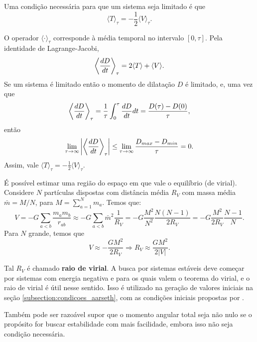 \begin{theorem}\label{teorema:virial}
    Uma condição necessária para que um sistema seja limitado é que
    \begin{equation*}
        \langle T \rangle_\tau = - \frac{1}{2} \langle V \rangle_\tau.
    \end{equation*}
\end{theorem}
\begin{Proof}
    O operador $\langle \cdot \rangle_\tau$ corresponde à média temporal no intervalo $[0, \tau]$. Pela identidade de Lagrange-Jacobi,
    \begin{equation*}
        \left\langle \dfrac{d D}{d t} \right\rangle_{\tau}
        = 2 \langle T \rangle + \langle V \rangle.
    \end{equation*}
    Se um sistema é limitado então o momento de dilatação $D$ é limitado, e, uma vez que
    \begin{equation*}
        \left\langle \dfrac{d D}{d t} \right\rangle_{\tau}
        = \frac{1}{\tau} \int_0^\tau \dfrac{d D}{d t} dt = \dfrac{D(\tau) - D(0)}{\tau},
    \end{equation*}
    então
    \begin{equation*}
        \lim_{\tau \to \infty} \left| \left\langle \dfrac{d D}{d t} \right\rangle_{\tau} \right| \leq \lim_{\tau \to \infty} \dfrac{D_{max} - D_{min}}{\tau} = 0.
    \end{equation*}
    Assim, vale $\langle T \rangle_\tau = - \frac{1}{2} \langle V \rangle_\tau$.
\end{Proof}

É possível estimar uma região do espaço em que vale o equilíbrio (de virial). Considere $N$ partículas dispostas com distância média $R_V$ com massa média $\bar m = M / N$, para $M = \sum_{a=1}^N m_a$. Temos que:
\begin{equation*}
    V = - G \sum_{a < b} \dfrac{m_a m_b}{r_{ab}}
    \approx - G \sum_{a<b} \bar m^2 \dfrac{1}{R_V}
    = - G \dfrac{M^2}{N^2} \dfrac{N (N-1)}{2 R_V}
    = - G \dfrac{M^2}{2 R_V} \dfrac{N-1}{N}.
\end{equation*}
Para $N$ grande, temos que
\begin{equation}\label{eq:raio_virial}
    V \approx - \dfrac{G M^2}{2 R_V}
    \Rightarrow
    R_V \approx \dfrac{G M^2}{2 |V|}.
\end{equation}

Tal $R_V$ é chamado \textbf{raio de virial}. A busca por sistemas estáveis deve começar por sistemas com energia negativa e para os quais valem o teorema do virial, e o raio de virial é útil nesse sentido. Isso é utilizado na geração de valores iniciais na seção \ref{subsection:condicoes_aarseth}, com as condições iniciais propostas por \citep{aarseth_gravitational_2003}. 

Também pode ser razoável supor que o momento angular total seja não nulo se o propósito for buscar estabilidade com mais facilidade, embora isso não seja condição necessária.